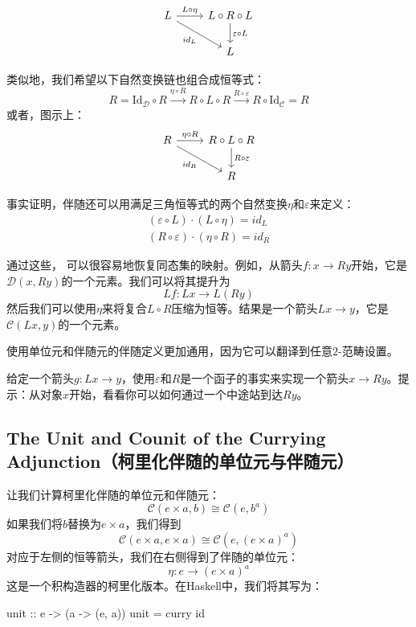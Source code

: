 \documentclass[DaoFP]{subfiles}
\begin{document}
    \[
        \begin{tikzcd}
            L
            \arrow[r, "L \circ \eta"]
            \arrow[rd, "id_L"']
            & L \circ R \circ L
            \arrow[d, "\varepsilon \circ L"]
            \\
            & L
        \end{tikzcd}
    \]

    类似地，我们希望以下自然变换链也组合成恒等式：
    \[ R = \text{Id}_{\mathcal{D}} \circ R \xrightarrow{\eta \circ R} R \circ L \circ R \xrightarrow{R \circ \varepsilon} R \circ \text{Id}_{\mathcal{C}} = R \]
    或者，图示上：
    \[
        \begin{tikzcd}
            R
            \arrow[r, "\eta \circ R"]
            \arrow[rd, "id_R"']
            & R \circ L \circ R
            \arrow[d, "R \circ \varepsilon"]
            \\
            & R
        \end{tikzcd}
    \]

    事实证明，伴随还可以用满足三角恒等式的两个自然变换$\eta$和$\varepsilon$来定义：
    \begin{align*}
    (\varepsilon \circ L) \cdot (L \circ \eta) = id_L \\
    (R \circ \varepsilon) \cdot (\eta \circ R) = id_R
    \end{align*}

    通过这些， 可以很容易地恢复同态集的映射。例如，从箭头$f \colon x \to R y$开始，它是$\mathcal{D}( x , R y)$的一个元素。我们可以将其提升为
    \[L f \colon L x \to L (R y)\]
    然后我们可以使用$\eta$来将复合$L \circ R$压缩为恒等。结果是一个箭头$L x \to y$，它是$ \mathcal{C} (L x, y)$的一个元素。

    使用单位元和伴随元的伴随定义更加通用，因为它可以翻译到任意$2$-范畴设置。

    \begin{exercise}
        给定一个箭头$g \colon L x \to y$，使用$\varepsilon$和$R$是一个函子的事实来实现一个箭头$x \to R y$。提示：从对象$x$开始，看看你可以如何通过一个中途站到达$R y$。
    \end{exercise}

    \subsection{The Unit and Counit of the Currying Adjunction（柯里化伴随的单位元与伴随元）}

    让我们计算柯里化伴随的单位元和伴随元：
    \[  \mathcal{C}(e \times a, b ) \cong  \mathcal{C} (e, b^a)  \]
    如果我们将$b$替换为$e \times a$，我们得到
    \[  \mathcal{C}(e \times a, e \times a ) \cong  \mathcal{C} (e, (e \times a)^a)  \]
    对应于左侧的恒等箭头，我们在右侧得到了伴随的单位元：
    \[ \eta \colon e \to (e \times a)^a \]
    这是一个积构造器的柯里化版本。在Haskell中，我们将其写为：
    \begin{haskell}
        unit :: e -> (a -> (e, a))
        unit = curry id
    \end{haskell}
\end{document}

